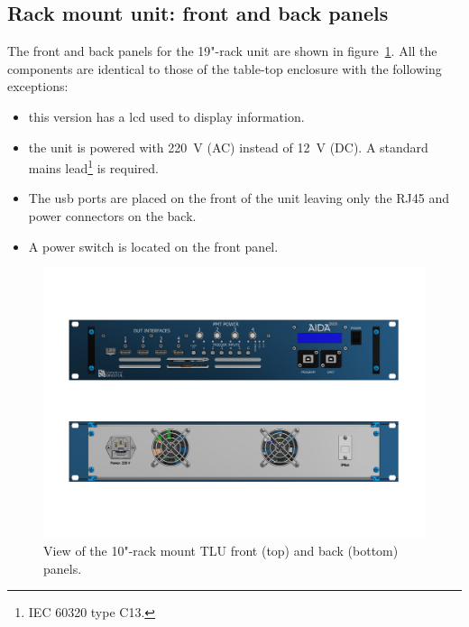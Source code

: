 \subsection{Rack mount unit: front and back panels}\label{ch:rackmountpanel}
The front and back panels for the 19"-rack unit are shown in figure~\ref{fig:rackmountpanels}. All the components are identical to those of the table-top enclosure with the following exceptions:
\begin{itemize}
  \item this version has a \gls{lcd} used to display information.
  \item the unit is powered with 220~V (AC) instead of 12~V (DC). A standard mains lead\footnote{IEC 60320 type C13.} is required.
  \item The \gls{usb} ports are placed on the front of the unit leaving only the RJ45 and power connectors on the back.
  \item A power switch is located on the front panel.
\end{itemize}
\begin{figure}
  \centering
  \includegraphics[width=.990\textwidth]{./Images/TLU_19rack.pdf}
  \caption{View of the 10"-rack mount TLU front (top) and back (bottom) panels.}
  \label{fig:rackmountpanels}
\end{figure}



